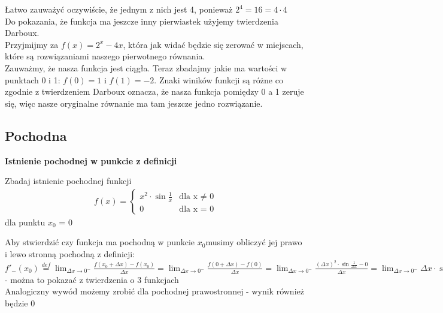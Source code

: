 \documentclass[12pt]{article}
\begin{document}
	\noindent Łatwo zauważyć oczywiście, że jednym z nich jest 4, ponieważ $2^4 = 16 = 4 \cdot 4$ \\

	\noindent Do pokazania, że funkcja ma jeszcze inny pierwiastek użyjemy twierdzenia Darboux. \\
	Przyjmijmy za $f(x) = 2^x - 4x$, która jak widać będzie się zerować w miejscach, które są rozwiązaniami naszego pierwotnego równania. \\
	Zauważmy, że nasza funkcja jest ciągła. Teraz zbadajmy jakie ma wartości w punktach 0 i 1: $f(0) = 1$ i $f(1) = -2$. Znaki winików funkcji są różne co zgodnie z twierdzeniem Darboux oznacza, 
	że nasza funkcja pomiędzy 0 a 1 zeruje się, więc nasze oryginalne równanie ma tam jeszcze jedno rozwiązanie.


    \subsection{Pochodna}

    \textbf{Istnienie pochodnej w punkcie z definicji} \\

    \begin{exercise}
		Zbadaj istnienie pochodnej funkcji
		\begin{align*}
         		f(x) =
              \begin{cases}
              	x^2 \cdot \sin{\frac{1}{x}} & \text{dla x $\neq$ 0} \\
                   0 & \text{dla x = 0}
			\end{cases}
		\end{align*}
    		dla punktu $x_{0}$ = 0
	\end{exercise}

    \noindent Aby stwierdzić czy funkcja ma pochodną w punkcie $x_{0}$musimy obliczyć jej prawo i lewo stronną pochodną z definicji: \\

    \noindent $f'_{-}(x_{0}) \stackrel{def}{=} \lim_{\Delta x \to 0^{-}} \frac{f(x_{0} + \Delta x) - f(x_{0})}{\Delta x} = \lim_{\Delta x \to 0^{-}} \frac{f(0 + \Delta x) - f(0)}{\Delta x} = \lim_{\Delta x \to 0^{-}} \frac{(\Delta x)^2 \cdot \sin{\frac{1}{\Delta x}} - 0}{\Delta x} = 
 \lim_{\Delta x \to 0^{-}} \Delta x \cdot \sin{\frac{1}{\Delta x}} = 0$ - można to pokazać z twierdzenia o 3 funkcjach \\

    \noindent Analogiczny wywód możemy zrobić dla pochodnej prawostronnej - wynik również będzie 0 \\
\end{document}
